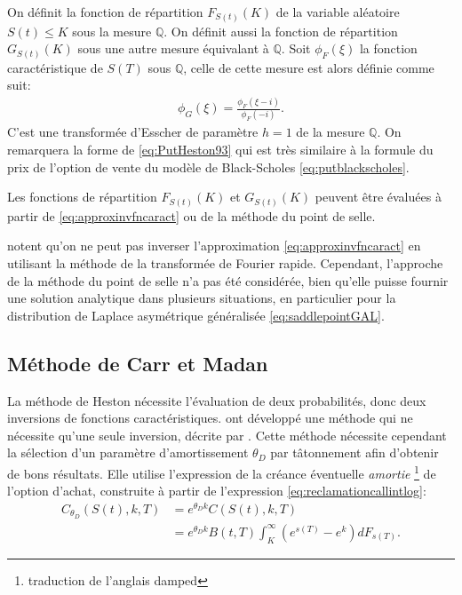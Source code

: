 On définit la fonction de répartition $F_{S(t)}(K)$ de la variable
aléatoire $S(t) \leq K$ sous la mesure $\mathbb{Q}$. On définit aussi
la fonction de répartition $G_{S(t)}(K)$ sous une autre mesure
équivalant à $\mathbb{Q}$. Soit $\phi_F(\xi)$ la fonction
caractéristique de $S(T)$ sous $\mathbb{Q}$, celle de cette mesure est
alors définie comme suit:
\begin{align}
  \label{eq:mesureGHeston}
  \phi_G(\xi) = \frac{\phi_F(\xi-i)}{\phi_F(-i)}.
\end{align}
C'est une transformée d'Esscher de paramètre $h=1$ de la mesure
$\mathbb{Q}$. On remarquera la forme de \eqref{eq:PutHeston93} qui est
très similaire à la formule du prix de l'option de vente du modèle de
Black-Scholes \eqref{eq:putblackscholes}.

Les fonctions de répartition $F_{S(t)}(K)$ et $G_{S(t)}(K)$
peuvent être évaluées à partir de \eqref{eq:approxinvfncaract} ou de
la méthode du point de selle.

\cite{carr1999option} notent qu'on ne peut pas inverser
l'approximation \eqref{eq:approxinvfncaract} en utilisant la méthode
de la transformée de Fourier rapide. Cependant, l'approche de la
méthode du point de selle n'a pas été considérée, bien qu'elle puisse
fournir une solution analytique dans plusieurs situations, en
particulier pour la distribution de Laplace asymétrique généralisée
\eqref{eq:saddlepointGAL}.

\subsection{Méthode de Carr et Madan}
\label{sec:carrmadanfftoptions}

La méthode de Heston nécessite l'évaluation de deux probabilités, donc
deux inversions de fonctions
caractéristiques. \cite{madan1998variance} ont développé une méthode
qui ne nécessite qu'une seule inversion, décrite par
\cite{epps2007pricing}. Cette méthode nécessite cependant la sélection
d'un paramètre d'amortissement $\theta_{D}$ par tâtonnement afin
d'obtenir de bons résultats. Elle utilise l'expression de la créance
éventuelle \emph{amortie} \footnote{traduction de l'anglais damped} de
l'option d'achat, construite à partir de l'expression
\eqref{eq:reclamationcallintlog}:
\begin{align}
  \label{eq:callamortiCarr}
  C_{\theta_D}(S(t),k,T) &= e^{\theta_{D}k} C(S(t),k,T) \\
  &= e^{\theta_{D}k} B(t,T) \int_{K}^{\infty} (e^{s(T)}-e^{k})
  d{F}_{s(T)}.
\end{align}

